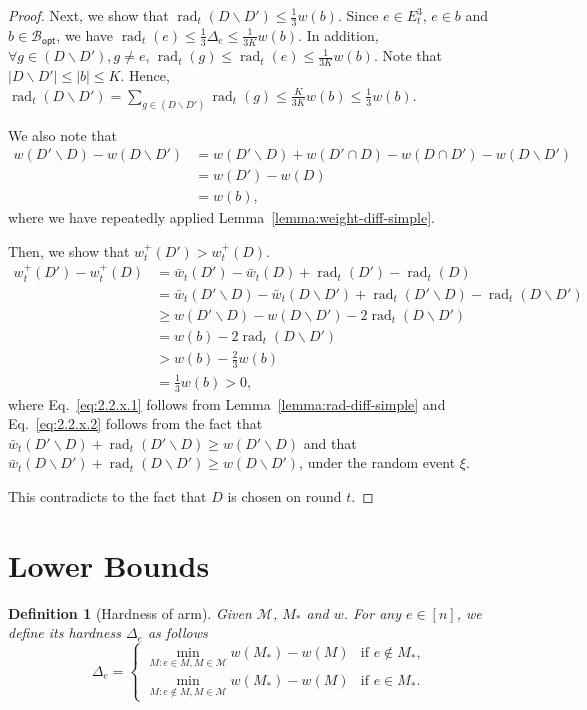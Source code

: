 \documentclass{article}
\newtheorem{define}{Definition}
\newcommand{\M}{\mathcal M}
\newcommand{\del}{\backslash}
\newcommand{\Bopt}{\mathcal B_{\mathsf{opt}}}
\DeclareMathOperator{\rad}{rad}
\begin{document}
\begin{spacing}{1.1}
\begin{proof}
Next, we show that $\rad_t(D \del D') \le \frac13 w(b)$.
Since $e\in E_t^3$, $e\in b$ and $b\in \Bopt$, we have $\rad_t(e) \le \frac{1}{3}\Delta_e \le \frac{1}{3K}w(b)$.
In addition, $\forall g\in (D \del D'), g\not=e$, $\rad_t(g) \le \rad_t(e)\le \frac{1}{3K}w(b)$.
Note that $|D\del D'| \le |b| \le K$.
Hence, $\rad_t(D\del D') = \sum_{g\in (D\del D')} \rad_t(g) \le \frac{K}{3K}w(b) \le \frac{1}{3}w(b)$.

We also note that
\begin{align}
w(D'\del D)-w(D\del D') &= w(D' \del D)+w(D'\cap D)-w(D\cap D')-w(D\del D')\\
						&= w(D')-w(D) \\
						&= w(b),
\end{align}
where we have repeatedly applied Lemma~\ref{lemma:weight-diff-simple}.

Then, we show that $w^+_t(D') > w^+_t(D)$.
\begin{align}
	w_t^+(D')-w_t^+(D) &= \bar w_t(D')-\bar w_t(D)+\rad_t(D')-\rad_t(D)\\
					   &= \bar w_t(D'\del D)-\bar w_t(D\del D')+\rad_t(D'\del D)-\rad_t(D\del D') \label{eq:2.2.x.1} \\
					   &\ge w(D'\del D)-w(D\del D')-2\rad_t(D\del D') \label{eq:2.2.x.2} \\
					   &= w(b)-2\rad_t(D\del D')\\
					   &> w(b)-\frac23 w(b) \\
					   &= \frac13 w(b) > 0,
\end{align}
where Eq.~\eqref{eq:2.2.x.1} follows from Lemma~\ref{lemma:rad-diff-simple} and Eq.~\eqref{eq:2.2.x.2} follows from
the fact that $\bar w_t(D'\del D)+\rad_t(D'\del D)\ge w(D'\del D)$ and that $\bar w_t(D\del D')+\rad_t(D\del D')\ge w(D\del D')$, under the random event $\xi$.

This contradicts to the fact that $D$ is chosen on round $t$.
\end{proof}


\section{Lower Bounds}

\begin{define}[Hardness of arm]
Given $\M$, $M_*$ and $w$.
For any $e\in[n]$, we define its hardness $\Delta_e$ as follows
$$
\Delta_e = \begin{cases}
			   \min_{M: e\in M, M\in \M} w(M_*)-w(M) & \text{if } e\not \in M_*, \\
			   \min_{M: e\not \in M, M\in \M} w(M_*)-w(M) & \text{if } e\in M_*.
			\end{cases}
$$
\end{define}


\end{spacing}
\end{document}
